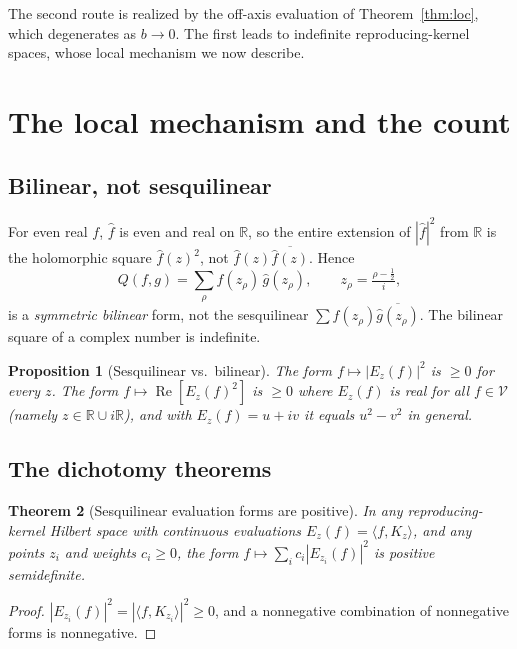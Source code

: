 \documentclass[11pt]{amsart}
\newtheorem{theorem}{Theorem}[section]
\newtheorem{proposition}[theorem]{Proposition}
\theoremstyle{definition}
\theoremstyle{remark}
\renewcommand{\Re}{\operatorname{Re}}
\newcommand{\fhat}{\widehat f}
\newcommand{\ghat}{\widehat g}
\begin{document}
The second route is realized by the off-axis evaluation of Theorem~\ref{thm:loc}, which
degenerates as $b\to0$. The first leads to indefinite reproducing-kernel spaces, whose local
mechanism we now describe.

\section{The local mechanism and the count}\label{sec:mechanism}

\subsection{Bilinear, not sesquilinear}
For even real $f$, $\fhat$ is even and real on $\mathbb R$, so the entire extension of
$|\fhat|^2$ from $\mathbb R$ is the holomorphic square $\fhat(z)^2$, not $\fhat(z)\overline{\fhat(z)}$.
Hence
\begin{equation}\label{eq:bilinear}
Q(f,g)=\sum_\rho\fhat(z_\rho)\,\ghat(z_\rho),\qquad z_\rho=\tfrac{\rho-\frac12}{i},
\end{equation}
is a \emph{symmetric bilinear} form, not the sesquilinear $\sum\fhat(z_\rho)\overline{\ghat
(z_\rho)}$. The bilinear square of a complex number is indefinite.

\begin{proposition}[Sesquilinear vs.\ bilinear]\label{prop:vs}
The form $f\mapsto|E_z(f)|^2$ is $\ge0$ for every $z$. The form $f\mapsto\Re[E_z(f)^2]$ is
$\ge0$ where $E_z(f)$ is real for all $f\in\mathcal V$ (namely $z\in\mathbb R\cup i\mathbb R$),
and with $E_z(f)=u+iv$ it equals $u^2-v^2$ in general.
\end{proposition}

\subsection{The dichotomy theorems}
\begin{theorem}[Sesquilinear evaluation forms are positive]\label{thm:E}
In any reproducing-kernel Hilbert space with continuous evaluations $E_z(f)=\langle f,K_z
\rangle$, and any points $z_i$ and weights $c_i\ge0$, the form $f\mapsto\sum_i c_i|E_{z_i}(f)|^2$
is positive semidefinite.
\end{theorem}
\begin{proof}
$|E_{z_i}(f)|^2=|\langle f,K_{z_i}\rangle|^2\ge0$, and a nonnegative combination of
nonnegative forms is nonnegative.
\end{proof}
\end{document}
